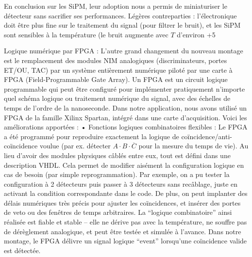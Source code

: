 \documentclass[a4paper,12pt,twoside]{article}
\begin{document}
En conclusion sur les SiPM, leur adoption nous a permis de miniaturiser le détecteur sans sacrifier ses performances. Légères contreparties : l’électronique doit être plus fine sur le traitement du signal (pour filtrer le bruit), et les SiPM sont sensibles à la température (le bruit augmente avec $T$ d’environ +5%

Logique numérique par FPGA : L’autre grand changement du nouveau montage est le remplacement des modules NIM analogiques (discriminateurs, portes ET/OU, TAC) par un système entièrement numérique piloté par une carte à FPGA (Field-Programmable Gate Array). Un FPGA est un circuit logique programmable qui peut être configuré pour implémenter pratiquement n’importe quel schéma logique ou traitement numérique du signal, avec des échelles de temps de l’ordre de la nanoseconde. Dans notre application, nous avons utilisé un FPGA de la famille Xilinx Spartan, intégré dans une carte d’acquisition. Voici les améliorations apportées :
	•	Fonctions logiques combinatoires flexibles : Le FPGA a été programmé pour reproduire exactement la logique de coïncidence/anti-coïncidence voulue (par ex. détecter $A \cdot B \cdot \overline{C}$ pour la mesure du temps de vie). Au lieu d’avoir des modules physiques câblés entre eux, tout est défini dans une description VHDL. Cela permet de modifier aisément la configuration logique en cas de besoin (par simple reprogrammation). Par exemple, on a pu tester la configuration à 2 détecteurs puis passer à 3 détecteurs sans recâblage, juste en activant la condition correspondante dans le code. De plus, on peut implanter des délais numériques très précis pour ajuster les coïncidences, et insérer des portes de veto ou des fenêtres de temps arbitraires. La “logique combinatoire” ainsi réalisée est fiable et stable – elle ne dérive pas avec la température, ne souffre pas de dérèglement analogique, et peut être testée et simulée à l’avance. Dans notre montage, le FPGA délivre un signal logique “event” lorsqu’une coïncidence valide est détectée.
\end{document}
